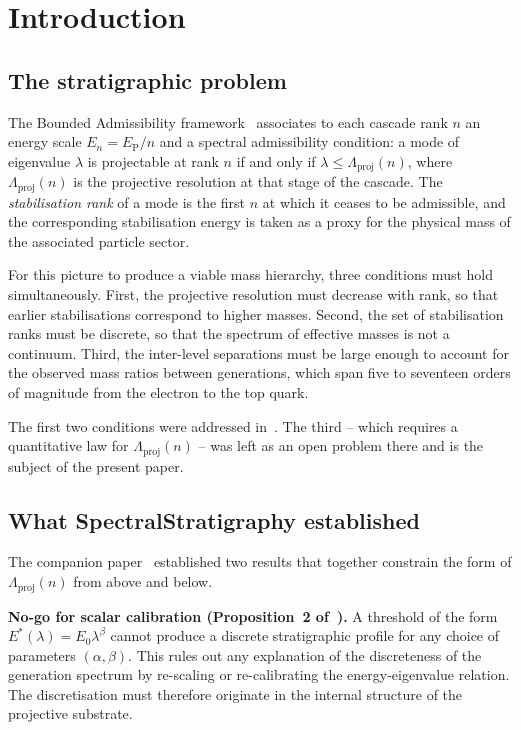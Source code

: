 \section{Introduction}
  \label{sec:intro}

  \subsection{The stratigraphic problem}
    \label{sec:intro:problem}

    The Bounded Admissibility framework~\cite{Cosmochrony} associates to each
    cascade rank $n$ an energy scale $E_n = E_{\mathrm{P}}/n$ and a spectral
    admissibility condition: a mode of eigenvalue $\lambda$ is projectable at rank
    $n$ if and only if $\lambda \leq \Lambda_{\mathrm{proj}}(n)$, where
    $\Lambda_{\mathrm{proj}}(n)$ is the projective resolution at that stage of the
    cascade.
    The \emph{stabilisation rank} of a mode is the first $n$ at which it ceases
    to be admissible, and the corresponding stabilisation energy is taken as a
    proxy for the physical mass of the associated particle sector.

    For this picture to produce a viable mass hierarchy, three conditions must hold
    simultaneously.
    First, the projective resolution must decrease with rank, so that earlier
    stabilisations correspond to higher masses.
    Second, the set of stabilisation ranks must be discrete, so that the spectrum
    of effective masses is not a continuum.
    Third, the inter-level separations must be large enough to account for the
    observed mass ratios between generations, which span five to seventeen orders
    of magnitude from the electron to the top quark.

    The first two conditions were addressed in~\cite{Beau2026a4}.
    The third -- which requires a quantitative law for $\Lambda_{\mathrm{proj}}(n)$
    -- was left as an open problem there and is the subject of the present paper.

  \subsection{What SpectralStratigraphy established}
    \label{sec:intro:stratigraphy}

    The companion paper~\cite{Beau2026a4} established two results that
    together constrain the form of $\Lambda_{\mathrm{proj}}(n)$ from above and
    below.

    \medskip
    \noindent\textbf{No-go for scalar calibration (Proposition~2
of~\cite{Beau2026a4}).}
    A threshold of the form $E^*(\lambda) = E_0 \lambda^\beta$ cannot produce a
    discrete stratigraphic profile for any choice of parameters $(\alpha, \beta)$.
    This rules out any explanation of the discreteness of the generation spectrum
    by re-scaling or re-calibrating the energy-eigenvalue relation.
    The discretisation must therefore originate in the internal structure of the
    projective substrate.


